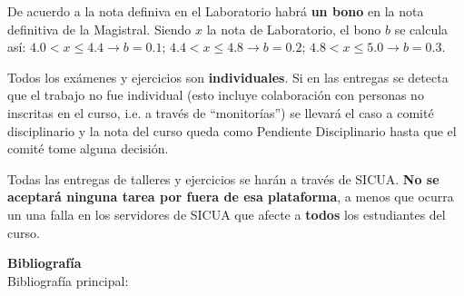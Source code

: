 \documentclass[letterpaper,10pt,onecolumn]{article}
\begin{document}
De acuerdo a la nota definiva en el Laboratorio habr\'a {\bf un bono} en la
nota definitiva de la Magistral. 
Siendo $x$ la nota de Laboratorio, el bono $b$  se calcula as\'i:
$4.0 < x \leq 4.4 \rightarrow b=0.1$; $4.4< x\leq 4.8\rightarrow b=0.2$; $4.8<x
\leq 5.0\rightarrow b=0.3$.

Todos los ex\'amenes y ejercicios son
\textbf{individuales}.  
Si en las entregas se detecta que el trabajo no fue
individual (esto incluye colaboraci\'on con personas no inscritas en
el curso, i.e. a trav\'es de ``monitor\'ias'') se llevar\'a el caso a
comit\'e disciplinario y la nota del curso queda como Pendiente
Disciplinario hasta que el comit\'e tome alguna decisi\'on. 

Todas las entregas de talleres y ejercicios se har\'an a trav\'es de
SICUA.  {\bf No se aceptar\'a ninguna tarea por fuera de esa
  plataforma}, a menos que ocurra un una falla en los servidores de
SICUA que afecte a {\bf todos} los estudiantes del curso.


\vspace*{0.5cm} 

\noindent\textbf{\large {} \quad
  Bibliograf\'ia}\\[-0.2cm] 



\noindent\normalsize Bibliograf\'ia principal:
\end{document}
